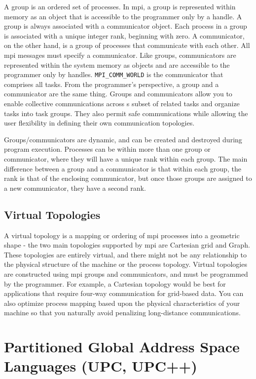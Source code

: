 \documentclass[10pt]{article}
\begin{document}
\begin{flushleft}
A group is an ordered set of processes. In \gls{mpi}, a group is represented within memory as an object that is accessible to the programmer only by a handle. A group is always associated with a communicator object. Each process in a group is associated with a unique integer rank, beginning with zero. A communicator, on the other hand, is a group of processes that communicate with each other. All \gls{mpi} messages must specify a communicator. Like groups, communicators are represented within the system memory as objects and are accessible to the programmer only by handles. {\tt MPI\_COMM\_WORLD} is the communicator that comprises all tasks. From the programmer's perspective, a group and a communicator are the same thing. Groups and communicators allow you to enable collective communications across s subset of related tasks and organize tasks into task groups. They also permit safe communications while allowing the user flexibility in defining their own communication topologies. 

Groups/communicators are dynamic, and can be created and destroyed during program execution. Processes can be within more than one group or communicator, where they will have a unique rank within each group. The main difference between a group and a communicator is that within each group, the rank is that of the enclosing communicator, but once those groups are assigned to a new communicator, they have a second rank. 

\subsection{Virtual Topologies}

A virtual topology is a mapping or ordering of \gls{mpi} processes into a geometric shape - the two main topologies supported by \gls{mpi} are Cartesian grid and Graph. These topologies are entirely virtual, and there might not be any relationship to the physical structure of the machine or the process topology. Virtual topologies are constructed using \gls{mpi} groups and communicators, and must be programmed by the programmer. For example, a Cartesian topology would be best for applications that require four-way communication for grid-based data. You can also optimize process mapping based upon the physical characteristics of your machine so that you naturally avoid penalizing long-distance communications. 

\section{Partitioned Global Address Space Languages (UPC, UPC++)}


\end{flushleft}
\end{document}
